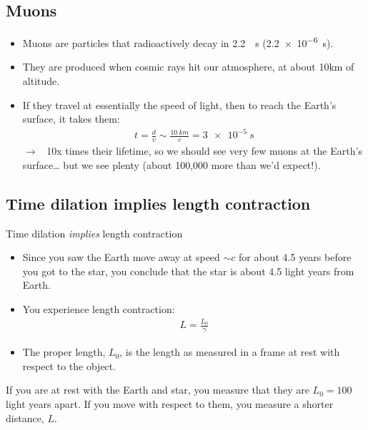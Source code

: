 \documentclass[aspectratio=169,
hyperref={colorlinks,urlcolor=blue}
]{beamer}
\begin{document}
\subsection{Muons}
\label{subsec:muons}
{
\begin{itemize}
\item Muons are particles that radioactively decay in \SI{2.2}{\mu s} (\SI{2.2e-6}{s}).
\item They are produced when cosmic rays hit our atmosphere, at about 10km of altitude.
\item If they travel at essentially the speed of light, then to reach the Earth’s surface, it takes them:
\begin{align*}
t=\frac{d}{v}\sim\frac{\SI{10}{km}}{c}=\SI{3e-5}{s}
\end{align*}
$\rightarrow$ ~10x times their lifetime, so we should see very few muons at the Earth’s surface… but we see plenty (about 100,000 more than we’d expect!).
\end{itemize}
}
{
}





\subsection{Time dilation implies length contraction}
\label{subsec:timedilationimplieslengthcontraction}
\begin{frame}{Time dilation \emph{implies} length contraction}
\begin{itemize}
\item Since you saw the Earth move away at speed $\sim c$ for about 4.5 years before you got to the star, you conclude that the star is about 4.5 light years from Earth.
\item You experience length contraction:
\begin{align*}
L=\frac{L_0}{\gamma}
\end{align*}
\item[$\rightarrow$] The proper length, $L_0$, is the length as measured in a frame at rest with respect to the object.
\end{itemize}
If you are at rest with the Earth and star, you measure that they are $L_0=100$ light years apart. If you move with respect to them, you measure a shorter distance, $L$. 
\end{frame}
\end{document}

